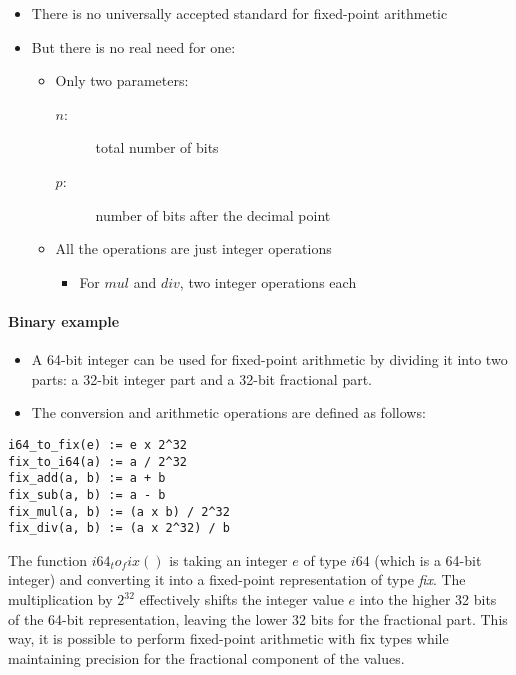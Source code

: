 \documentclass[12pt]{article}
\begin{document}
\begin{itemize}
	\item There is no universally accepted standard for fixed-point arithmetic
	\item But there is no real need for one:
	\begin{itemize}
		\item Only two parameters:
		\begin{description}
			\item[$n$:] total number of bits
			\item[$p$:] number of bits after the decimal point
		\end{description}
		\item All the operations are just integer operations
		\begin{itemize}
			\item For $mul$ and $div$, two integer operations each
		\end{itemize}
	\end{itemize}
\end{itemize}

\paragraph{Binary example}
\begin{itemize}
    \item A 64-bit integer can be used for fixed-point arithmetic by dividing it into two parts: a 32-bit integer part and a 32-bit fractional part.
    \item The conversion and arithmetic operations are defined as follows:
\end{itemize}


\begin{lstlisting}
i64_to_fix(e) := e x 2^32
fix_to_i64(a) := a / 2^32
fix_add(a, b) := a + b
fix_sub(a, b) := a - b
fix_mul(a, b) := (a x b) / 2^32
fix_div(a, b) := (a x 2^32) / b
\end{lstlisting}

The function $i64_to_fix()$ is taking an integer $e$ of type $i64$ (which is a 64-bit integer) and converting it into a fixed-point representation of type \textit{fix}. The multiplication by $2^32$ effectively shifts the integer value $e$ into the higher 32 bits of the 64-bit representation, leaving the lower 32 bits for the fractional part. This way,  it is possible to perform fixed-point arithmetic with fix types while maintaining precision for the fractional component of the values.\\
\end{document}

